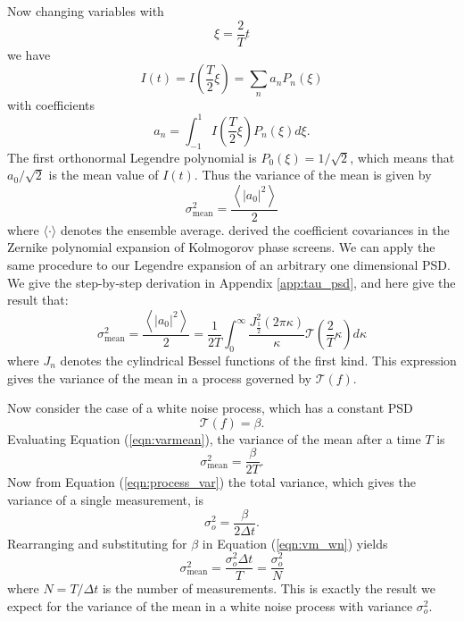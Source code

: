 \documentclass[10pt,preprint]{aastex631}
\begin{document}
Now changing variables with
\begin{equation}
\xi = \frac{2}{T}t
\end{equation}
we have
\begin{equation}
I(t) = I\left(\frac{T}{2}\xi\right) = \sum_n a_n P_n(\xi)
\label{eqn:basisexpansion}
\end{equation}
with coefficients
\begin{equation}
a_n = \int_{-1}^{1} I\left(\frac{T}{2}\xi\right)P_n(\xi) d\xi.
\label{eqn:expansecoeff}
\end{equation}
The first orthonormal Legendre polynomial is $P_0(\xi) = 1/\sqrt{2}$, which means that $a_0/\sqrt{2}$ is the mean value of $I(t)$.  Thus the variance of the mean is given by
\begin{equation}
\sigma_\mathrm{mean}^2 = \frac{\left\langle \left|a_0\right|^2 \right\rangle}{2}
\label{eqn:varmean_def}
\end{equation}
where $\langle \cdot \rangle$ denotes the ensemble average.  \citet{1976JOSA...66..207N} derived the coefficient covariances in the Zernike polynomial expansion of Kolmogorov phase screens.  We can apply the same procedure to our Legendre expansion of an arbitrary one dimensional PSD.  We give the step-by-step derivation in Appendix \ref{app:tau_psd}, and here give the result that:
\begin{equation}
\sigma_\mathrm{mean}^2 = \frac{\left\langle \left|a_0\right|^2 \right\rangle}{2} = \frac{1}{2T}  \int_0^{\infty} \frac{ J_{\frac{1}{2}}^2(2\pi \kappa)}{\kappa} \mathcal{T}\left( \frac{2}{T} \kappa \right) d\kappa
\label{eqn:varmean}
\end{equation}
where $J_n$ denotes the cylindrical Bessel functions of the first kind.  This expression gives the variance of the mean in a process governed by $\mathcal{T}(f)$.

Now consider the case of a white noise process, which has a constant PSD
\begin{equation}
\mathcal{T}(f) = \beta.
\end{equation}
Evaluating Equation (\ref{eqn:varmean}), the variance of the mean after a time $T$ is 
\begin{equation}
\sigma_\mathrm{mean}^2 = \frac{\beta}{2T}.
\label{eqn:vm_wn}
\end{equation}
Now from Equation (\ref{eqn:process_var}) the total variance, which gives the variance of a single measurement, is
\begin{equation}
\sigma_o^2  = \frac{\beta}{2\Delta t}.
\end{equation}
Rearranging and substituting for $\beta$ in Equation (\ref{eqn:vm_wn}) yields
\begin{equation}
\sigma_\mathrm{mean}^2 =  \frac{\sigma_o^2 \Delta t}{T} = \frac{\sigma_o^2}{N}
\end{equation}
where $N = T/\Delta t$ is the number of measurements.  This is exactly the result we expect for the variance of the mean in a white noise process with variance $\sigma^2_o$. 
\end{document}

